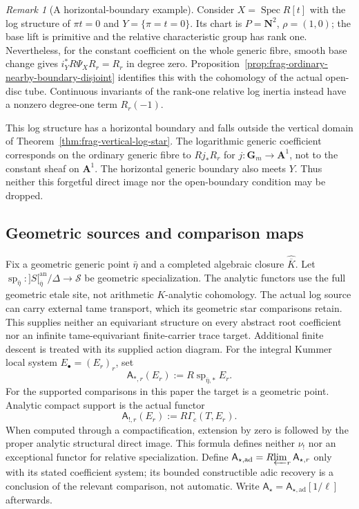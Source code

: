 \documentclass[11pt]{article}
\theoremstyle{definition}
\theoremstyle{remark}
\newtheorem{remark}[theorem]{Remark}
\begin{document}
\begin{remark}[A horizontal-boundary example]
\label{rem:frag-horizontal-log-test}
Consider $X=\operatorname{Spec}R[t]$ with the log structure of
$\pi t=0$ and $Y=\{\pi=t=0\}$.  Its chart is
$P=\mathbf N^2$, $\rho=(1,0)$; the base lift is primitive and the
relative characteristic group has rank one.  Nevertheless, for the
constant coefficient on the whole generic fibre, smooth base change
gives $i_Y^*R\Psi_XR_r=R_r$ in degree zero.  Proposition~\ref{prop:frag-ordinary-nearby-boundary-disjoint} identifies this with
the cohomology of the actual open-disc tube.  Continuous invariants
of the rank-one relative log inertia instead have a nonzero degree-one
term $R_r(-1)$.

This log structure has a horizontal boundary and falls outside the
vertical domain of Theorem~\ref{thm:frag-vertical-log-star}.  The logarithmic generic coefficient corresponds on
the ordinary generic fibre to $Rj_*R_r$ for $j:\mathbf G_m\to\mathbf A^1$,
not to the constant sheaf on $\mathbf A^1$.  The horizontal generic
boundary also meets $Y$.  Thus neither this forgetful direct image nor
the open-boundary condition may be dropped.
\end{remark}


\subsection{Geometric sources and comparison maps}


Fix a geometric generic point $\bar\eta$ and a completed algebraic closure
$\widehat{\overline K}$.  Let
$\operatorname{sp}_{\bar\eta}:]S[_{\bar\eta}^{\mathrm{an}}/\Delta\to\mathscr S$
be geometric specialization.  The analytic functors use the full geometric
etale site, not arithmetic $K$-analytic cohomology.  The actual log
source can carry external tame transport, which its geometric star
comparisons retain.  This supplies neither an equivariant structure
on every abstract root coefficient nor an infinite tame-equivariant
finite-carrier trace target.  Additional finite descent is treated
with its supplied action diagram.
For the integral Kummer local system $E_\bullet=(E_r)_r$, set
\[
\mathsf A_{*,r}(E_r):=R\operatorname{sp}_{\bar\eta,*}E_r.
\]
For the supported comparisons in this paper the target is a geometric
point.  Analytic compact support is the actual functor
\begin{equation}
\mathsf A_{!,r}(E_r):=R\Gamma_c(T,E_r).
\label{eq:frag-analytic-sp-shriek-definition}
\end{equation}
When computed through a compactification, extension by zero is followed
by the proper analytic structural direct image.  This formula defines
neither $\nu_!$ nor an exceptional functor for relative specialization.
Define $\mathsf A_{\star,\mathrm{ad}}=R\!\varprojlim_r\mathsf A_{\star,r}$
only with its stated coefficient system; its bounded constructible adic
recovery is a conclusion of the relevant comparison, not automatic.
Write $\mathsf A_\star=\mathsf A_{\star,\mathrm{ad}}[1/\ell]$ afterwards.
\end{document}
